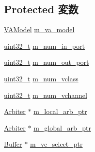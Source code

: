 \subsection*{Protected 変数}
\begin{DoxyCompactItemize}
\item 
\hyperlink{classVCAllocator_a3d177565c3d0e6810797e2aed095e676}{VAModel} \hyperlink{classVCAllocator_aed33459ed8901eb1f02e4f90785a655f}{m\_\-va\_\-model}
\item 
\hyperlink{Type_8hh_a435d1572bf3f880d55459d9805097f62}{uint32\_\-t} \hyperlink{classVCAllocator_aac6d2a4ff86073212e8ef4ac53742ddc}{m\_\-num\_\-in\_\-port}
\item 
\hyperlink{Type_8hh_a435d1572bf3f880d55459d9805097f62}{uint32\_\-t} \hyperlink{classVCAllocator_a56cb909217f28866d2a08a40adb3ef08}{m\_\-num\_\-out\_\-port}
\item 
\hyperlink{Type_8hh_a435d1572bf3f880d55459d9805097f62}{uint32\_\-t} \hyperlink{classVCAllocator_ac6cc31c075b331538b0aaa0bb593b2e3}{m\_\-num\_\-vclass}
\item 
\hyperlink{Type_8hh_a435d1572bf3f880d55459d9805097f62}{uint32\_\-t} \hyperlink{classVCAllocator_ac0b1d8a0523e7c7ce285c7917a764c9f}{m\_\-num\_\-vchannel}
\item 
\hyperlink{classArbiter}{Arbiter} $\ast$ \hyperlink{classVCAllocator_a3fec644111569687c929cb731f8b34b6}{m\_\-local\_\-arb\_\-ptr}
\item 
\hyperlink{classArbiter}{Arbiter} $\ast$ \hyperlink{classVCAllocator_a6d083f13327cb48999835d4710329be8}{m\_\-global\_\-arb\_\-ptr}
\item 
\hyperlink{classBuffer}{Buffer} $\ast$ \hyperlink{classVCAllocator_aebc14356cedcf94a99d5ec2d6cde741f}{m\_\-vc\_\-select\_\-ptr}
\end{DoxyCompactItemize}



